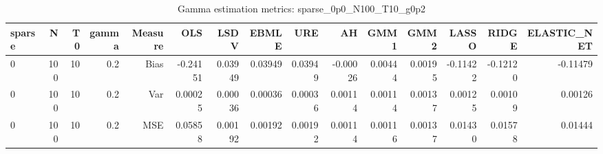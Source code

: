 \begin{table}[!htbp]\centering
\caption{Gamma estimation metrics: sparse_0p0_N100_T10_g0p2}
\label{tab:table1_sparse_0p0_N100_T10_g0p2}
\begin{tabular}{lrrrrrrrrrrrrrr}
\hline
sparse & N & T0 & gamma & Measure & OLS & LSDV & EBMLE & URE & AH & GMM1 & GMM2 & LASSO & RIDGE & ELASTIC_NET \\
\hline
0 & 100 & 10 & 0.2 & Bias & -0.24151 & 0.03949 & 0.03949 & 0.03949 & -0.00026 & 0.00444 & 0.00195 & -0.11422 & -0.12120 & -0.11479 \\
0 & 100 & 10 & 0.2 & Var & 0.00025 & 0.00036 & 0.00036 & 0.00036 & 0.00114 & 0.00114 & 0.00137 & 0.00125 & 0.00109 & 0.00126 \\
0 & 100 & 10 & 0.2 & MSE & 0.05858 & 0.00192 & 0.00192 & 0.00192 & 0.00114 & 0.00116 & 0.00137 & 0.01430 & 0.01578 & 0.01444 \\
\hline
\end{tabular}
\end{table}

